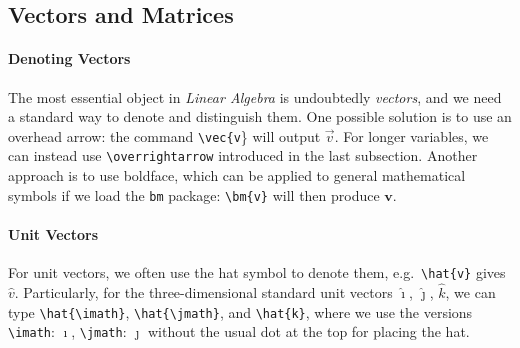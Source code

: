 \subsection{Vectors and Matrices}

\paragraph{Denoting Vectors}
The most essential object in \textit{Linear Algebra} is undoubtedly \textit{vectors}, and we need a standard way to denote and distinguish them. One possible solution is to use an overhead arrow: the command \texttt{\textbackslash vec\{v}\} will output $\vec{v}$. For longer variables, we can instead use \texttt{\textbackslash overrightarrow} introduced in the last subsection. Another approach is to use boldface, which can be applied to general mathematical symbols if we load the \verb|bm| package: \texttt{\textbackslash bm\{v\}} will then produce $\bm{v}$.

\paragraph{Unit Vectors}
For unit vectors, we often use the hat symbol to denote them, e.g.\ \texttt{\textbackslash hat\{v\}} gives $\hat{v}$. Particularly, for the three-dimensional standard unit vectors $\hat{\imath}$, $\hat{\jmath}$, $\hat{k}$, we can type \texttt{\textbackslash hat\{\textbackslash imath\}}, \texttt{\textbackslash hat\{\textbackslash jmath\}}, and \texttt{\textbackslash hat\{k\}}, where we use the versions \texttt{\textbackslash imath}: $\imath$, \texttt{\textbackslash jmath}: $\jmath$ without the usual dot at the top for placing the hat. 

